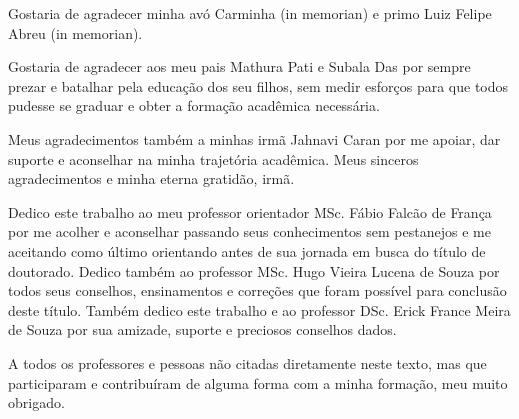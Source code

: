 \begin{agradecimentos}
Gostaria de agradecer minha avó Carminha (in memorian) e primo Luiz Felipe Abreu (in memorian).

	Gostaria de agradecer aos meu pais Mathura Pati e Subala Das por sempre prezar e batalhar pela educação dos seu filhos, sem medir esforços para que todos pudesse se graduar e obter a formação acadêmica necessária.

	Meus agradecimentos também a minhas irmã Jahnavi Caran por me apoiar, dar suporte e aconselhar na minha trajetória acadêmica. Meus sinceros agradecimentos e minha eterna gratidão, irmã.

	Dedico este trabalho ao meu professor orientador MSc. Fábio Falcão de França por me acolher e aconselhar passando seus conhecimentos sem pestanejos e me aceitando como último orientando antes de sua jornada em busca do título de doutorado. Dedico também ao professor MSc. Hugo Vieira Lucena de Souza por todos seus conselhos, ensinamentos e correções que foram possível para conclusão deste título. Também dedico este trabalho e ao professor DSc. Erick France Meira de Souza por sua amizade, suporte e preciosos conselhos dados.

	A todos os professores e pessoas não citadas diretamente neste texto, mas que participaram e contribuíram de alguma forma com a minha formação, meu muito obrigado.
\end{agradecimentos}
